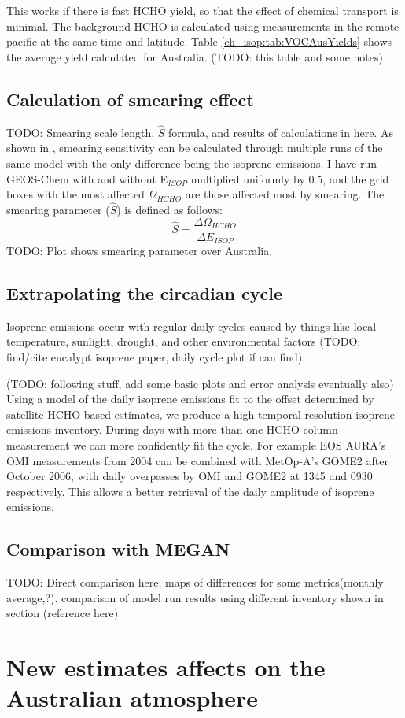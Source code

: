     This works if there is fast HCHO yield, so that the effect of chemical transport is minimal.
    The background HCHO is calculated using measurements in the remote pacific at the same time and latitude.
    Table \ref{ch_isop:tab:VOCAusYields} shows the average yield calculated for Australia. (TODO: this table and some notes)
    
  \subsection{Calculation of smearing effect}
    TODO: Smearing scale length, $\hat{S}$ formula, and results of calculations in here.
    As shown in \cite{Palmer2003}, smearing sensitivity can be calculated through multiple runs of the same model with the only difference being the isoprene emissions.
    I have run GEOS-Chem with and without E$_{ISOP}$ multiplied uniformly by 0.5, and the grid boxes with the most affected $\Omega_{HCHO}$ are those affected most by smearing.
    The smearing parameter  ($\hat{S}$) is defined as follows:
    \begin{equation}
      \hat{S} = \frac{\Delta \Omega_{HCHO}}{\Delta E_{ISOP}}
    \end{equation}
    TODO: Plot shows smearing parameter over Australia.
    
  \subsection{Extrapolating the circadian cycle}
    Isoprene emissions occur with regular daily cycles caused by things like local temperature, sunlight, drought, and other environmental factors (TODO: find/cite eucalypt isoprene paper, daily cycle plot if can find).
    
    (TODO: following stuff, add some basic plots and error analysis eventually also)
    Using a model of the daily isoprene emissions fit to the offset determined by satellite HCHO based estimates, we produce a high temporal resolution isoprene emissions inventory.
    During days with more than one HCHO column measurement we can more confidently fit the cycle. 
    For example EOS AURA's OMI measurements from 2004 can be combined with MetOp-A's GOME2 after October 2006, with daily overpasses by OMI and GOME2 at 1345 and 0930 respectively.
    This allows a better retrieval of the daily amplitude of isoprene emissions.
    
  \subsection{Comparison with MEGAN}
    TODO: Direct comparison here, maps of differences for some metrics(monthly average,?). comparison of model run results using different inventory shown in section (reference here)

\section{New estimates affects on the Australian atmosphere}

